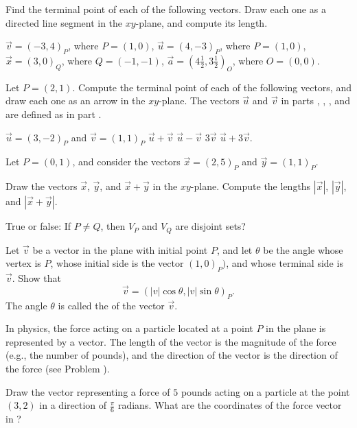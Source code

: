 \begin{exercises}

Find the terminal point of each of the following vectors.
Draw each one as a directed line segment in
the $xy$-plane, and compute its length.
\begin{exenum}
\x
$\vec v = (-3,4)_P$, where $P = (1,0)$,
\x
$\vec u = (4, -3)_P$, where $P = (1,0)$,
\x
$\vec x = (3,0)_Q$, where $Q = (-1,-1)$,
\x
$\vec a = (4\frac12,3\frac12)_O$, where $O = (0,0)$.
\end{exenum}

Let $P = (2,1)$.
Compute the terminal point of each of the following
vectors, and draw each one as an arrow in the
$xy$-plane.  The vectors $\vec u$ and $\vec v$
in parts , ,
, and  are defined
as in part .
\begin{exenum}
\x
{}
$\vec u = (3,-2)_P$ and $\vec v = (1,1)_P$
\x
{}
$\vec u + \vec v$
\x
{}
$\vec u - \vec v$
\x
{}
$3\vec v$
\x
{}
$\vec u + 3\vec v$.
\end{exenum}

Let $P = (0,1)$, and consider the vectors
$\vec x = (2,5)_P$ and $\vec y = (1,1)_P$.
\begin{exenum}
\x
Draw the vectors $\vec x$, $\vec y$, and
$\vec x + \vec y$ in the $xy$-plane.
\x
Compute the lengths $|\vec x|$, $|\vec y|$,
and $|\vec x+\vec y|$.
\end{exenum}

True or false: If $P \ne Q$, then $V_P$ and $V_Q$
are disjoint sets?

Let $\vec v$ be a vector in the plane with initial
point $P$, and let $\theta$ be the angle whose
vertex is $P$, whose initial side is the vector
$(1,0)_P)$, and whose terminal side is $\vec v$.
Show that
\[
\vec v = (|v| \cos \theta, |v| \sin \theta)_P
.
\]
The angle $\theta$ is called the 
of the vector $\vec v$.

In physics, the force acting on a particle located
at a point $P$ in the plane is represented by a vector.
The length of the vector is the magnitude of the force
(e.g., the number of pounds), and the direction
of the vector is the direction of the force
(see Problem ).
\begin{exenum}
\x
{}
Draw the vector representing a force of $5$ pounds
acting on a particle at the point $(3,2)$ in a
direction of $\frac{\pi}6$ radians.
\x
What are the coordinates of the force vector
in ?
\end{exenum}


\end{exercises}
